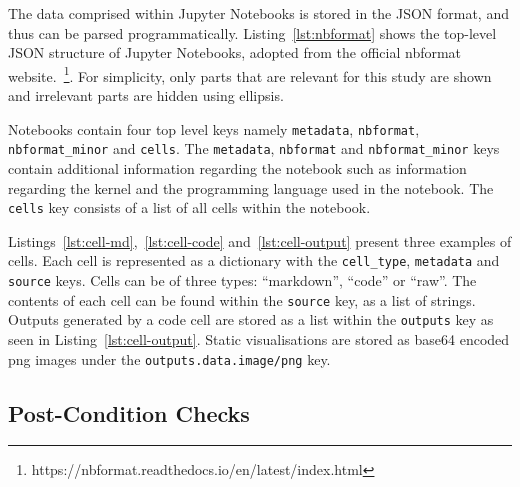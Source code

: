 \documentclass[conference]{IEEEtran}
\begin{document}
The data comprised within Jupyter Notebooks is stored in the JSON format, and thus can be parsed programmatically. Listing~\ref{lst:nbformat} shows the top-level JSON structure of Jupyter Notebooks, adopted from the official nbformat website.~\footnote{https://nbformat.readthedocs.io/en/latest/index.html}. For simplicity, only parts that are relevant for this study are shown and irrelevant parts are hidden using ellipsis.

Notebooks contain four top level keys namely \texttt{metadata}, \texttt{nbformat}, \texttt{nbformat\_minor} and \texttt{cells}. The \texttt{metadata}, \texttt{nbformat} and \texttt{nbformat\_minor} keys contain additional information regarding the notebook such as information regarding the kernel and the programming language used in the notebook. The \texttt{cells} key consists of a list of all cells within the notebook.

Listings~\ref{lst:cell-md},~\ref{lst:cell-code} and~\ref{lst:cell-output} present three examples of cells. Each cell is represented as a dictionary with the \texttt{cell\_type}, \texttt{metadata} and \texttt{source} keys. Cells can be of three types: ``markdown'', ``code'' or ``raw''. The contents of each cell can be found within the \texttt{source} key, as a list of strings. Outputs generated by a code cell are stored as a list within the \texttt{outputs} key as seen in Listing~\ref{lst:cell-output}. Static visualisations are stored as base64 encoded png images under the \texttt{outputs.data.image/png} key.

\subsection{Post-Condition Checks}\label{sec:post-cond}
\end{document}
